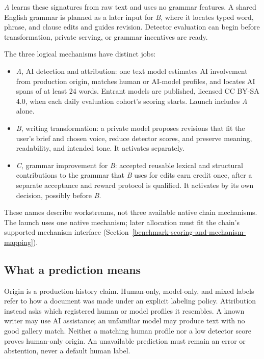 \textit{A} learns these signatures from raw text and uses no grammar features.
A shared English grammar is planned as a later input for \textit{B}, where it
locates typed word, phrase, and clause edits and guides revision. Detector
evaluation can begin before transformation, private serving, or grammar
incentives are ready.

The three logical mechanisms have distinct jobs:
\begin{itemize}\tightlist
\item \textit{A}, AI detection and attribution: one text model estimates AI
involvement from production origin, matches human or AI-model profiles, and
locates AI spans of at least 24 words. Entrant models are
published, licensed CC BY-SA 4.0, when each daily evaluation cohort's scoring
starts.
Launch includes \textit{A} alone.
\item \textit{B}, writing transformation: a private model proposes revisions
that fit the user's brief and chosen voice, reduce detector scores, and preserve
meaning, readability, and intended tone. It activates separately.
\item \textit{C}, grammar improvement for \textit{B}: accepted reusable lexical
and structural contributions to the grammar that \textit{B} uses for edits earn
credit once, after a separate acceptance and reward protocol is qualified. It
activates by its own decision, possibly before \textit{B}.
\end{itemize}
These names describe workstreams, not three available native chain mechanisms.
The launch uses one native mechanism; later allocation must fit the chain's
supported mechanism interface (Section~\ref{benchmark-scoring-and-mechanism-mapping}).

\subsection{What a prediction means}

Origin is a production-history claim. Human-only, model-only, and mixed labels
refer to how a document was made under an explicit labeling policy. Attribution
instead asks which registered human or model profiles it resembles. A known
writer may use AI assistance; an unfamiliar model may produce text with no good
gallery match. Neither a matching human profile nor a low detector score proves
human-only origin. An unavailable prediction must remain an error or abstention,
never a default human label.

